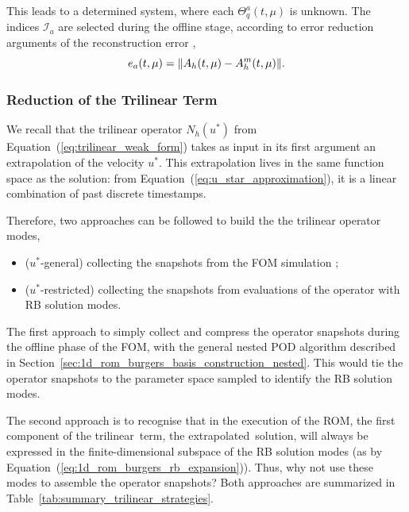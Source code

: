 \documentclass[../../thesis.tex]{subfiles}
\begin{document}
This leads to a determined system, where each $\Theta_q^a(t, \mu)$ is unknown.
The indices $\mathcal{I}_a$ are selected during the offline stage, 
according to error reduction arguments of the reconstruction error
\cite{2010_nonlinearModelReductionDeim_chaturantabut},
\begin{equation}
    e_a(t, \mu) = \norm{A_h(t, \mu) - A_h^m(t, \mu)}.
\end{equation}

\newpage
\subsubsection{Reduction of the Trilinear Term}
We recall that the trilinear operator $N_h(u^{*})$ 
from Equation~(\ref{eq:trilinear_weak_form})
takes as input in its first argument an extrapolation of the velocity $u^{*}$.
This extrapolation lives in the same function space as the solution:
from Equation~(\ref{eq:u_star_approximation}),
it is a linear combination of past discrete timestamps.

Therefore, two approaches can be followed to build the the trilinear operator modes,
\begin{itemize}
    \item (\mbox{$u^{*}$-general}) collecting the snapshots from the FOM simulation \cite{Santo_Manzoni_2019};
    \item (\mbox{$u^{*}$-restricted}) collecting the snapshots from evaluations of the operator with RB solution modes.
\end{itemize}
The first approach to simply 
collect and compress the operator snapshots 
during the offline phase of the FOM,
with the general nested POD algorithm described 
in Section~\ref{sec:1d_rom_burgers_basis_construction_nested}.
This would tie the operator snapshots to the parameter space
sampled to identify the RB solution modes.

The second approach is to recognise that in the execution of the ROM,
the first component of the trilinear term, the extrapolated solution, 
will always be expressed in the finite-dimensional subspace of the RB solution modes
(as by Equation~(\ref{eq:1d_rom_burgers_rb_expansion})).
Thus, why not use these modes to assemble the operator snapshots?
Both approaches are summarized in Table~\ref{tab:summary_trilinear_strategies}.
\end{document}
